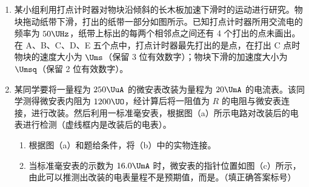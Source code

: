 \documentclass[\gkver]{gaokaozhenti}
\begin{document}
\begin{enumerate}
\item
某小组利用打点计时器对物块沿倾斜的长木板加速下滑时的运动进行研究。物块拖动纸带下滑，打出的纸带一部分如图所示。已知打点计时器所用交流电的频率为 $50\UHz$，纸带上标出的每两个相邻点之间还有 4 个打出的点未画出。在 A、B、C、D、E 五个点中，打点计时器最先打出的是点，在打出 C 点时物块的速度大小为 $\Ums$（保留 3 位有效数字）；物块下滑的加速度大小为 $\Umsq$（保留 2 位有效数字）。



\item
某同学要将一量程为 $250\UuA$ 的微安表改装为量程为 $20\UmA$ 的电流表。该同学测得微安表内阻为 $1200\UO$，经计算后将一阻值为 $R$ 的电阻与微安表连接，进行改装。然后利用一标准毫安表，根据图（a）所示电路对改装后的电表进行检测（虚线框内是改装后的电表）。


\begin{enumerate}
	\item
	根据图（a）和题给条件，将（b）中的实物连接。
	\item
	当标准毫安表的示数为 $16.0\UmA$ 时，微安表的指针位置如图（c）所示，由此可以推测出改装的电表量程不是预期值，而是。（填正确答案标号）



\end{enumerate}
\end{enumerate}
\end{document}
